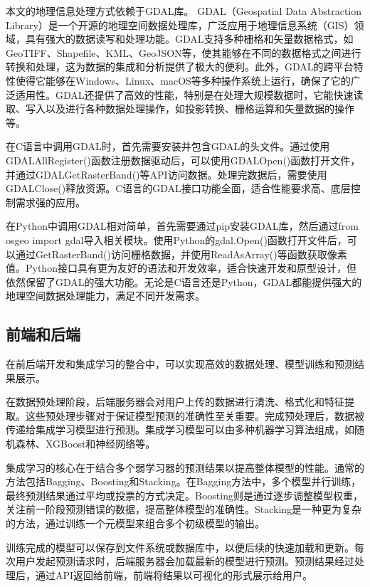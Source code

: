 \documentclass{article}
\begin{document}
	本文的地理信息处理方式依赖于GDAL库。
	GDAL（Geospatial Data Abstraction Library）是一个开源的地理空间数据处理库，广泛应用于地理信息系统（GIS）领域，具有强大的数据读写和处理功能。GDAL支持多种栅格和矢量数据格式，如GeoTIFF、Shapefile、KML、GeoJSON等，使其能够在不同的数据格式之间进行转换和处理，这为数据的集成和分析提供了极大的便利。此外，GDAL的跨平台特性使得它能够在Windows、Linux、macOS等多种操作系统上运行，确保了它的广泛适用性。GDAL还提供了高效的性能，特别是在处理大规模数据时，它能快速读取、写入以及进行各种数据处理操作，如投影转换、栅格运算和矢量数据的操作等。
	
	在C语言中调用GDAL时，首先需要安装并包含GDAL的头文件。通过使用GDALAllRegister()函数注册数据驱动后，可以使用GDALOpen()函数打开文件，并通过GDALGetRasterBand()等API访问数据。处理完数据后，需要使用GDALClose()释放资源。C语言的GDAL接口功能全面，适合性能要求高、底层控制需求强的应用。
	
	在Python中调用GDAL相对简单，首先需要通过pip安装GDAL库，然后通过from osgeo import gdal导入相关模块。使用Python的gdal.Open()函数打开文件后，可以通过GetRasterBand()访问栅格数据，并使用ReadAsArray()等函数获取像素值。Python接口具有更为友好的语法和开发效率，适合快速开发和原型设计，但依然保留了GDAL的强大功能。无论是C语言还是Python，GDAL都能提供强大的地理空间数据处理能力，满足不同开发需求。


	\subsection{前端和后端}
	在前后端开发和集成学习的整合中，可以实现高效的数据处理、模型训练和预测结果展示。
	
	在数据预处理阶段，后端服务器会对用户上传的数据进行清洗、格式化和特征提取。这些预处理步骤对于保证模型预测的准确性至关重要。完成预处理后，数据被传递给集成学习模型进行预测。集成学习模型可以由多种机器学习算法组成，如随机森林、XGBoost和神经网络等。
	
	集成学习的核心在于结合多个弱学习器的预测结果以提高整体模型的性能。通常的方法包括Bagging、Boosting和Stacking。在Bagging方法中，多个模型并行训练，最终预测结果通过平均或投票的方式决定。Boosting则是通过逐步调整模型权重，关注前一阶段预测错误的数据，提高整体模型的准确性。Stacking是一种更为复杂的方法，通过训练一个元模型来组合多个初级模型的输出。
	
	训练完成的模型可以保存到文件系统或数据库中，以便后续的快速加载和更新。每次用户发起预测请求时，后端服务器会加载最新的模型进行预测。预测结果经过处理后，通过API返回给前端，前端将结果以可视化的形式展示给用户。
	
\end{document}
